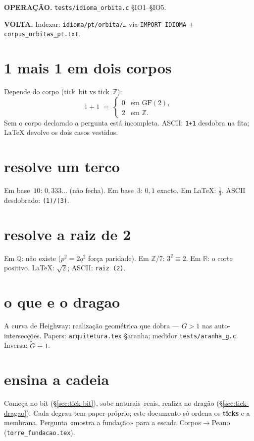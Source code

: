 \documentclass[11pt,a4paper]{article}
\newcommand{\code}[1]{\texttt{\small #1}}
\begin{document}
\textbf{OPERAÇÃO.} \code{tests/idioma\_orbita.c} §IO1--§IO5.

\textbf{VOLTA.} Indexar: \code{idioma/pt/orbita/\ldots} via
\code{IMPORT IDIOMA} + \code{corpus\_orbitas\_pt.txt}.

\section{1 mais 1 em dois corpos}
Depende do corpo (tick~bit vs tick~$\mathbb{Z}$):
\[
1+1 \;=\;
\begin{cases}
0 & \text{em }\mathrm{GF}(2),\\
2 & \text{em }\mathbb{Z}.
\end{cases}
\]
Sem o corpo declarado a pergunta está incompleta.
ASCII: \texttt{1+1} desdobra na fita; LaTeX devolve os dois casos vestidos.

\section{resolve um terco}
Em base~$10$: $0{,}333\ldots$ (não fecha). Em base~$3$: $0{,}1$ exacto.
Em LaTeX: $\frac{1}{3}$. ASCII desdobrado: \texttt{(1)/(3)}.

\section{resolve a raiz de 2}
Em $\mathbb{Q}$: não existe ($p^{2}=2q^{2}$ força paridade). Em
$\mathbb{Z}/7$: $3^{2}\equiv2$. Em $\mathbb{R}$: o corte positivo.
LaTeX: $\sqrt{2}$; ASCII: \texttt{raiz (2)}.

\section{o que e o dragao}
A curva de Heighway: realização geométrica que dobra --- $G>1$ nas
auto-intersecções. Papers: \code{arquitetura.tex} §aranha;
medidor \code{tests/aranha\_g.c}. Inversa: $\tilde G\equiv1$.

\section{ensina a cadeia}
Começa no bit (\S\ref{sec:tick-bit}), sobe naturais--reais, realiza no
dragão (\S\ref{sec:tick-dragao}). Cada degrau tem paper próprio; este
documento só ordena os \textbf{ticks} e a membrana. Pergunta
«mostra a fundação» para a escada Corpos$\to$Peano
(\code{torre\_fundacao.tex}).
\end{document}
